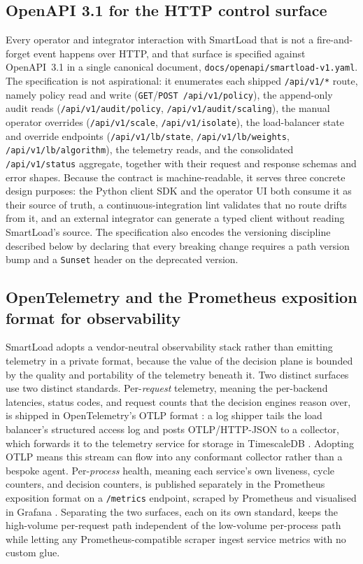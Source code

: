 \subsection{OpenAPI 3.1 for the HTTP control surface}
\label{dsa:sec:standards-openapi}

Every operator and integrator interaction with SmartLoad that is not a fire-and-forget
event happens over HTTP, and that surface is specified against OpenAPI~3.1
\cite{openapi} in a single canonical document, \texttt{docs/\allowbreak openapi/\allowbreak smartload-v1.yaml}.
The specification is not aspirational: it enumerates each shipped \texttt{/api/v1/*}
route, namely policy read and write (\texttt{GET}/\texttt{POST /api/v1/policy}), the
append-only audit reads (\texttt{/api/v1/audit/policy}, \texttt{/api/v1/audit/scaling}),
the manual operator overrides (\texttt{/api/v1/scale}, \texttt{/api/v1/isolate}), the
load-balancer state and override endpoints (\texttt{/api/v1/lb/state},
\texttt{/api/v1/lb/weights}, \texttt{/api/v1/lb/algorithm}), the telemetry reads, and
the consolidated \texttt{/api/v1/status} aggregate, together with their request and
response schemas and error shapes. Because the contract is machine-readable, it
serves three concrete design purposes: the Python client SDK and the operator UI
both consume it as their source of truth, a continuous-integration lint validates
that no route drifts from it, and an external integrator can generate a typed client
without reading SmartLoad's source. The specification also encodes the versioning
discipline described below by declaring that every breaking change requires a path
version bump and a \texttt{Sunset} header on the deprecated version.

\subsection{OpenTelemetry and the Prometheus exposition format for observability}
\label{dsa:sec:standards-telemetry}

SmartLoad adopts a vendor-neutral observability stack rather than emitting telemetry
in a private format, because the value of the decision plane is bounded by the
quality and portability of the telemetry beneath it. Two distinct surfaces use two
distinct standards. Per-\emph{request} telemetry, meaning the per-backend latencies,
status codes, and request counts that the decision engines reason over, is
shipped in OpenTelemetry's OTLP format \cite{opentelemetry}: a log shipper tails the
load balancer's structured access log and posts OTLP/HTTP-JSON to a collector, which
forwards it to the telemetry service for storage in TimescaleDB
\cite{timescaledb}. Adopting OTLP means this stream can flow into any conformant
collector rather than a bespoke agent. Per-\emph{process} health, meaning each
service's own liveness, cycle counters, and decision counters, is published separately in
the Prometheus exposition format \cite{prometheus} on a \texttt{/metrics} endpoint,
scraped by Prometheus and visualised in Grafana \cite{grafana}. Separating the two
surfaces, each on its own standard, keeps the high-volume per-request path
independent of the low-volume per-process path while letting any Prometheus-compatible
scraper ingest service metrics with no custom glue.

